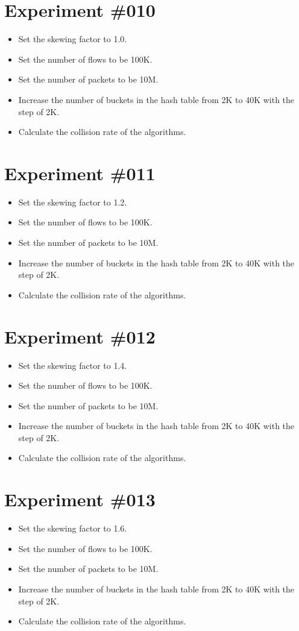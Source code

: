 \documentclass[10pt, conference, letterpaper]{IEEEtran}
\begin{document}
\section*{Experiment \#010}
\begin{itemize}
	\item Set the skewing factor to 1.0.
	\item Set the number of flows to be 100K.
	\item Set the number of packets to be 10M.
	\item Increase the number of buckets in the hash table from 2K to 40K with the step of 2K.
	\item Calculate the collision rate of the algorithms.
\end{itemize}

\section*{Experiment \#011}
\begin{itemize}
	\item Set the skewing factor to 1.2.
	\item Set the number of flows to be 100K.
	\item Set the number of packets to be 10M.
	\item Increase the number of buckets in the hash table from 2K to 40K with the step of 2K.
	\item Calculate the collision rate of the algorithms.
\end{itemize}

\section*{Experiment \#012}
\begin{itemize}
	\item Set the skewing factor to 1.4.
	\item Set the number of flows to be 100K.
	\item Set the number of packets to be 10M.
	\item Increase the number of buckets in the hash table from 2K to 40K with the step of 2K.
	\item Calculate the collision rate of the algorithms.
\end{itemize}

\section*{Experiment \#013}
\begin{itemize}
	\item Set the skewing factor to 1.6.
	\item Set the number of flows to be 100K.
	\item Set the number of packets to be 10M.
	\item Increase the number of buckets in the hash table from 2K to 40K with the step of 2K.
	\item Calculate the collision rate of the algorithms.
\end{itemize}
\end{document}
